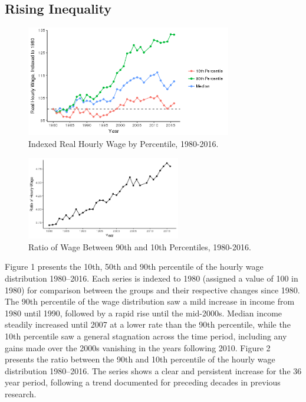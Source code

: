 \documentclass[notitlepage,12pt]{article}
\begin{document}
\subsection{Rising Inequality}
\begin{figure}[H]
  \centering
  \caption{Indexed Real Hourly Wage by Percentile, 1980-2016.}
  \includegraphics[width=0.8\textwidth]{Ineq_graph.png}
\end{figure}
\begin{figure}[b]
  \centering
  \caption{Ratio of Wage Between 90th and 10th Percentiles, 1980-2016.}
  \includegraphics[width=0.6\textwidth]{Ratio_plot1.png}
\end{figure}
Figure 1 presents the 10th, 50th and 90th percentile of the hourly wage distribution 1980--2016.  Each series is indexed to 1980 (assigned a value of 100 in 1980) for comparison between the groups and their respective changes since 1980.  The 90th percentile of the wage distribution saw a mild increase in income from 1980 until 1990, followed by a rapid rise until the mid-2000s. Median income steadily increased until 2007 at a lower rate than the 90th percentile, while the 10th percentile saw a general stagnation across the time period, including any gains made over the 2000s vanishing in the years following 2010.  Figure 2 presents the ratio between the 90th and 10th percentile of the hourly wage distribution 1980--2016.  The series shows a clear and persistent increase for the 36 year period, following a trend documented for preceding decades in previous research.
\end{document}
